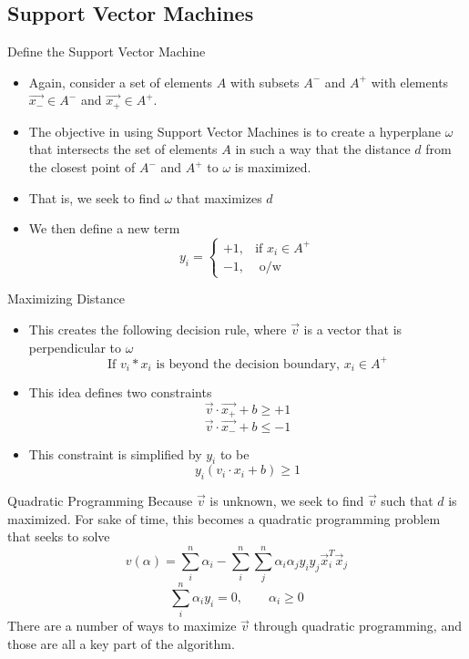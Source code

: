 \documentclass{beamer}
\begin{document}
\subsection{Support Vector Machines}
\begin{frame}{Define the Support Vector Machine}
\begin{itemize}
\item Again, consider a set of elements $A$ with subsets $A^-$ and $A^+$ with elements $\vec{x_-} \in A^-$ and $\vec{x_+} \in A^+$.
\item The objective in using Support Vector Machines is to create a hyperplane $\omega$ that intersects the set of elements $A$ in such a way that the distance $d$ from the closest point of $A^-$ and $A^+$ to $\omega$ is maximized.\nocite{Cortes1995}\nocite{mit_2014}
\item That is, we seek to find $\omega$ that maximizes $d$
\item We then define a new term $$y_i = \begin{cases}+1, &\text{if } x_i \in A^+\\ -1, & \text{ o/w}\end{cases}$$
\end{itemize}
\end{frame}

\begin{frame}{Maximizing Distance}
\begin{itemize}
\item This creates the following decision rule, where $\vec{v}$ is a vector that is perpendicular to $\omega$
$$\text{If } v_i * x_i \text{ is beyond the decision boundary, } x_i \in A^+$$
\item This idea defines two constraints
$$\vec{v}\cdot\vec{x_+} + b \geq +1$$
$$\vec{v}\cdot\vec{x_-} + b \leq -1$$
\item This constraint is simplified by $y_i$ to be
$$y_i(v_i \cdot x_i + b) \geq 1$$
\end{itemize}
\end{frame}

\begin{frame}{Quadratic Programming}
Because $\vec{v}$ is unknown, we seek to find $\vec{v}$ such that $d$ is maximized. For sake of time, this becomes a quadratic programming problem that seeks to solve
\begin{equation*}
v(\alpha) = \sum_i^n \alpha_i - \sum_i^n\sum_j^n \alpha_i \alpha_j y_i y_j \vec{x}_i^T \vec{x}_j
\end{equation*}
\begin{equation*}
\sum_i^n \alpha_iy_i = 0, \quad \quad \alpha_i \geq 0
\end{equation*}
There are a number of ways to maximize $\vec{v}$ through quadratic programming, and those are all a key part of the algorithm.
\end{frame}
\end{document}
